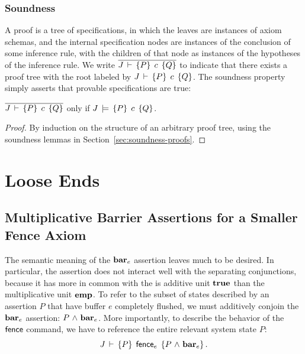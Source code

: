 \documentclass[11pt]{report}
\begin{document}
\subsection{Soundness}

A proof is a tree of specifications, in which the leaves are instances of axiom schemas, and the internal specification nodes are instances of the conclusion of some inference rule, with the children of that node as instances of the hypotheses of the inference rule. We write $\overline{J\,\vdash\,\left\lbrace P \right\rbrace\;c\;\left\lbrace Q \right\rbrace}$ to indicate that there exists a proof tree with the root labeled by $J\,\vdash\,\left\lbrace P \right\rbrace\;c\;\left\lbrace Q \right\rbrace$. The soundness property simply asserts that provable specifications are true: 

\begin{theorem}[Soundness]
  \label{thm:soundness}
	$\overline{J\,\vdash\,\left\lbrace P \right\rbrace\;c\;\left\lbrace Q \right\rbrace}$ only if $J\,\models\,\left\lbrace P \right\rbrace\;c\;\left\lbrace Q \right\rbrace$. 
\end{theorem}

\begin{proof}
	By induction on the structure of an arbitrary proof tree, using the soundness lemmas in Section~\ref{sec:soundness-proofs}. 
\end{proof}

\chapter{Loose Ends}


\section{Multiplicative Barrier Assertions for a Smaller Fence Axiom} 
\label{sec:multiplicative-barriers}

The semantic meaning of the $\mathbf{bar}_{e}$ assertion leaves much to be desired. In particular, the assertion does not interact well with the separating conjunctions, because it has more in common with the is additive unit $\mathbf{true}$ than the multiplicative unit $\mathbf{emp}$. To refer to the subset of states described by an assertion $P$ that have buffer $e$ completely flushed, we must additively conjoin the $\mathbf{bar}_{e}$ assertion: $P \operatorname{\,\wedge\,} \mathbf{bar}_{e}$. More importantly, to describe the behavior of the $\operatorname{\mathsf{fence}}$ command, we have to reference the entire relevant system state $P$: \[ J\,\vdash\,\left\lbrace P \right\rbrace\;\operatorname{\mathsf{fence}}_e\;\left\lbrace P \operatorname{\,\wedge\,} \mathbf{bar}_{e} \right\rbrace.\] 
\end{document}
